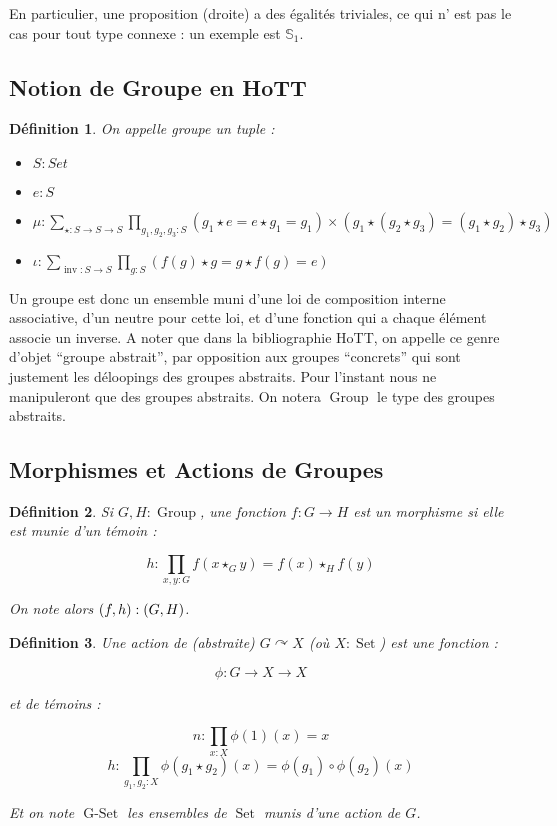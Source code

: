\documentclass{article}
\DeclareMathOperator{\inv}{inv}
\DeclareMathOperator{\gset}{G-Set}
\DeclareMathOperator{\set}{Set}
\DeclareMathOperator{\groupa}{Group}
\let\hom\relax
\DeclareMathOperator{\hom}{Hom}
\newtheorem{definition}{Définition}[section]
\begin{document}
En particulier, une proposition (droite) a des égalités triviales, ce qui n' est pas le cas pour tout type connexe : un exemple est $\mathbb{S}_{1}$.

\subsection{Notion de Groupe en HoTT}

\begin{definition}

On appelle \emph{groupe} un tuple :

\begin{itemize}
        \item $S : Set$
        \item $e : S$
        \item $\mu : \displaystyle\sum_{\star : S \to S \to S} \displaystyle\prod_{g_1,g_2, g_3 : S} (g_1 \star e = e \star g_1 = g_1 ) \times (g_1 \star (g_2 \star g_3) = (g_1 \star g_2) \star g_3) $
        \item $\iota : \displaystyle\sum_{\inv : S \to S} \displaystyle\prod_{g : S} (f(g) \star g = g \star f(g) = e)$
\end{itemize}

\end{definition}

Un groupe est donc un ensemble muni d'une loi de composition interne associative, d'un neutre pour cette loi, et d'une fonction qui a chaque élément associe un inverse. A noter que dans la bibliographie HoTT, on appelle ce genre d'objet ``groupe abstrait'', par opposition aux groupes ``concrets'' qui sont justement les déloopings des groupes abstraits. Pour l'instant nous ne manipuleront que des groupes abstraits. On notera $\groupa$ le type des groupes abstraits.

\subsection{Morphismes et Actions de Groupes}

\begin{definition}
Si $G,H : \groupa$, une fonction $f : G \to H$ est un morphisme si elle est munie d'un témoin :

\[h : \displaystyle\prod_{x,y : G} f(x \star_{G} y) = f(x) \star_{H} f(y) \]

On note alors $(f,h) : \hom(G,H)$.
\end{definition}

\begin{definition}
Une action de (abstraite) $G \curvearrowright X$ (où $X : \set$) est une fonction :

\[\phi : G \to X \to X \]

et de témoins :

\[n : \prod_{x : X}\phi(1)(x) = x\]
\[h : \prod_{g_1, g_2 : X}\phi(g_1 \star g_2)(x) = \phi(g_1) \circ \phi(g_2) (x)\]

Et on note $\gset$ les ensembles de $\set$ munis d'une action de $G$.
\end{definition}
\end{document}
